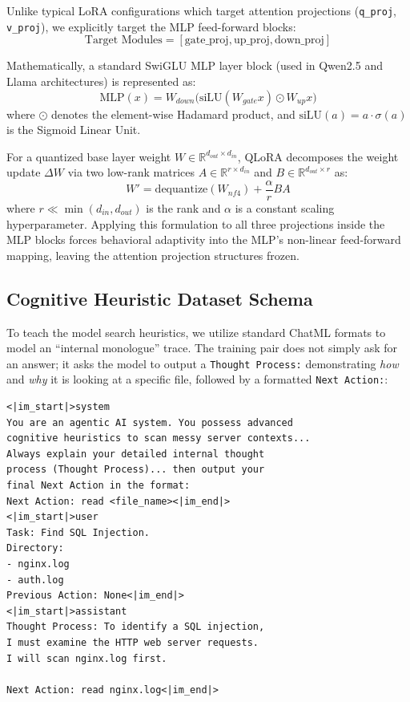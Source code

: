 \documentclass[10pt,twocolumn]{article}
\begin{document}
Unlike typical LoRA configurations which target attention projections (\texttt{q\_proj}, \texttt{v\_proj}), we explicitly target the MLP feed-forward blocks:
\begin{equation}
    \text{Target Modules} = [\text{gate\_proj}, \text{up\_proj}, \text{down\_proj}]
\end{equation}

Mathematically, a standard SwiGLU MLP layer block (used in Qwen2.5 and Llama architectures) is represented as:
\begin{equation}
    \text{MLP}(x) = W_{down} \Big( \text{siLU}(W_{gate} x) \odot W_{up} x \Big)
\end{equation}
where $\odot$ denotes the element-wise Hadamard product, and $\text{siLU}(a) = a \cdot \sigma(a)$ is the Sigmoid Linear Unit. 

For a quantized base layer weight $W \in \mathbb{R}^{d_{out} \times d_{in}}$, QLoRA decomposes the weight update $\Delta W$ via two low-rank matrices $A \in \mathbb{R}^{r \times d_{in}}$ and $B \in \mathbb{R}^{d_{out} \times r}$ as:
\begin{equation}
    W' = \text{dequantize}(W_{nf4}) + \frac{\alpha}{r} B A
\end{equation}
where $r \ll \min(d_{in}, d_{out})$ is the rank and $\alpha$ is a constant scaling hyperparameter. Applying this formulation to all three projections inside the MLP blocks forces behavioral adaptivity into the MLP's non-linear feed-forward mapping, leaving the attention projection structures frozen.

\subsection{Cognitive Heuristic Dataset Schema}
To teach the model search heuristics, we utilize standard ChatML formats to model an ``internal monologue'' trace. The training pair does not simply ask for an answer; it asks the model to output a \texttt{Thought Process:} demonstrating \textit{how} and \textit{why} it is looking at a specific file, followed by a formatted \texttt{Next Action:}:

\begin{small}
\begin{verbatim}
<|im_start|>system
You are an agentic AI system. You possess advanced
cognitive heuristics to scan messy server contexts...
Always explain your detailed internal thought
process (Thought Process)... then output your
final Next Action in the format:
Next Action: read <file_name><|im_end|>
<|im_start|>user
Task: Find SQL Injection.
Directory:
- nginx.log
- auth.log
Previous Action: None<|im_end|>
<|im_start|>assistant
Thought Process: To identify a SQL injection, 
I must examine the HTTP web server requests.
I will scan nginx.log first.

Next Action: read nginx.log<|im_end|>
\end{verbatim}
\end{small}
\end{document}
